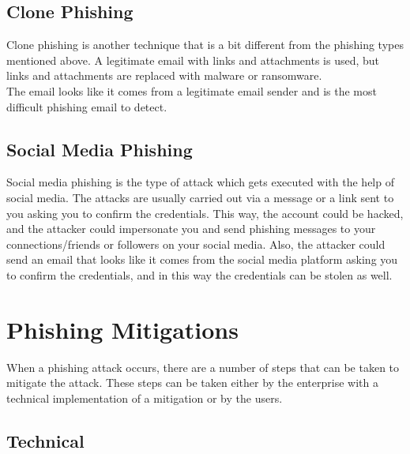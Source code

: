 \section{Clone Phishing}
Clone phishing is another technique that is a bit different from the phishing types mentioned above. 
A legitimate email with links and attachments is used, but links and attachments are replaced with malware or ransomware.  \\
The email looks like it comes from a legitimate email sender and is the most difficult phishing email to detect.

\section{Social Media Phishing}
Social media phishing is the type of attack which gets executed with the help of social media. 
The attacks are usually carried out via a message or a link sent to you asking you to confirm the credentials. 
This way, the account could be hacked, and the attacker could impersonate you and send phishing messages to your connections/friends or followers on your social media.
Also, the attacker could send an email that looks like it comes from the social media platform asking you to confirm the credentials, and in this way the credentials can be stolen as well.

\chapter{Phishing Mitigations}

When a phishing attack occurs, there are a number of steps that can be taken to mitigate the attack. These steps can be taken either by the enterprise with a technical implementation of a mitigation or by the users.

\section{Technical}

